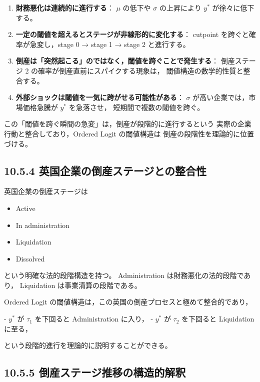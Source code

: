 \begin{enumerate}
    \item \textbf{財務悪化は連続的に進行する}：  
          $\mu$ の低下や $\sigma$ の上昇により $y^*$ が徐々に低下する。

    \item \textbf{一定の閾値を超えるとステージが非線形的に変化する}：  
          cutpoint を跨ぐと確率が急変し，stage 0 → stage 1 → stage 2 と進行する。

    \item \textbf{倒産は「突然起こる」のではなく，閾値を跨ぐことで発生する}：  
          倒産ステージ 2 の確率が倒産直前にスパイクする現象は，
          閾値構造の数学的性質と整合する。

    \item \textbf{外部ショックは閾値を一気に跨がせる可能性がある}：  
          $\sigma$ が高い企業では，市場価格急騰が $y^*$ を急落させ，
          短期間で複数の閾値を跨ぐ。
\end{enumerate}

この「閾値を跨ぐ瞬間の急変」は，倒産が段階的に進行するという
実際の企業行動と整合しており，Ordered Logit の閾値構造は
倒産の段階性を理論的に位置づける。

\subsection*{10.5.4 英国企業の倒産ステージとの整合性}

英国企業の倒産ステージは

\begin{itemize}
    \item Active  
    \item In administration  
    \item Liquidation  
    \item Dissolved  
\end{itemize}

という明確な法的段階構造を持つ。
Administration は財務悪化の法的段階であり，
Liquidation は事業清算の段階である。

Ordered Logit の閾値構造は，この英国の倒産プロセスと極めて整合的であり，

- $y^*$ が $\tau_1$ を下回ると Administration に入り，
- $y^*$ が $\tau_2$ を下回ると Liquidation に至る，

という段階的進行を理論的に説明することができる。

\subsection*{10.5.5 倒産ステージ推移の構造的解釈}

